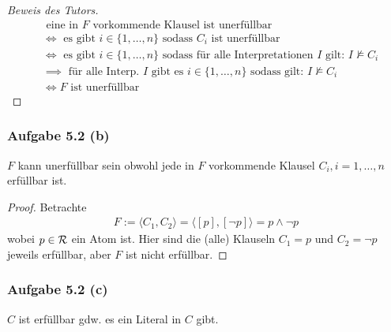 \begin{proof}[Beweis des Tutors]
	\begin{align*}
		&\text{ eine in $F$ vorkommende Klausel ist unerfüllbar}\\
		&\Longleftrightarrow\text{ es gibt $i\in\lbrace1,\ldots,n\rbrace$ sodass $C_i$ ist unerfüllbar}\\
		&\Longleftrightarrow\text{ es gibt $i\in\lbrace1,\ldots,n\rbrace$ sodass für alle Interpretationen $I$ gilt: }I\not\models C_i\\
		&\implies\text{ für alle Interp. $I$ gibt es $i\in\lbrace1,\ldots,n\rbrace$ sodass gilt: }I\not\models C_i\\
		&\Longleftrightarrow F\text{ ist unerfüllbar}
	\end{align*}
\end{proof}

\subsubsection{Aufgabe 5.2 (b)}
$F$ kann unerfüllbar sein obwohl jede in $F$ vorkommende Klausel $C_i,i=1,\ldots,n$ erfüllbar ist.

\begin{proof}
	Betrachte
	\begin{align*}
		F:=\langle C_1,C_2\rangle=\langle[p],[\neg p]\rangle=p\wedge\neg p
	\end{align*}
	wobei $p\in\mathcal{R}$ ein Atom ist. 
	Hier sind die (alle) Klauseln $C_1=p$ und $C_2=\neg p$  jeweils erfüllbar, aber $F$ ist nicht erfüllbar.
\end{proof}

\subsubsection{Aufgabe 5.2 (c)}
$C$ ist erfüllbar gdw. es ein Literal in $C$ gibt.

